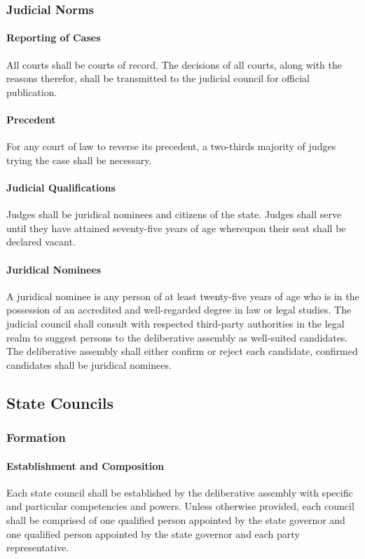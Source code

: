 \documentclass{article}
\begin{document}
\subsubsection{Judicial Norms}
\paragraph{Reporting of Cases}
All courts shall be courts of record. The decisions of all courts, along with the reasons therefor, shall be transmitted to the judicial council for official publication.
\paragraph{Precedent}
For any court of law to reverse its precedent, a two-thirds majority of judges trying the case shall be necessary.
\paragraph{Judicial Qualifications}
Judges shall be juridical nominees and citizens of the state. Judges shall serve until they have attained seventy-five years of age whereupon their seat shall be declared vacant.
\paragraph{Juridical Nominees}
A juridical nominee is any person of at least twenty-five years of age who is in the possession of an accredited and well-regarded degree in law or legal studies. The judicial council shall consult with respected third-party authorities in the legal realm to suggest persons to the deliberative assembly as well-suited candidates. The deliberative assembly shall either confirm or reject each candidate, confirmed candidates shall be juridical nominees.
\newpage
\subsection{State Councils}
\subsubsection{Formation}
\paragraph{Establishment and Composition}
Each state council shall be established by the deliberative assembly with specific and particular competencies and powers. Unless otherwise provided, each council shall be comprised of one qualified person appointed by the state governor and one qualified person appointed by the state governor and each party representative. 
\end{document}

